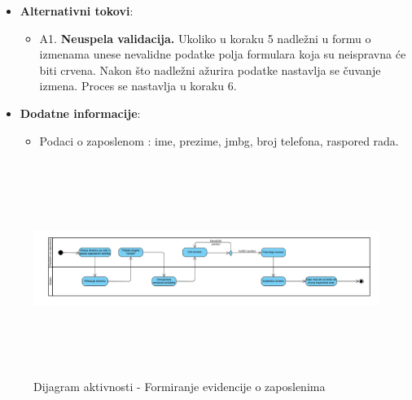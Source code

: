\begin{itemize}
  \item \textbf{Alternativni tokovi}:
      \begin{itemize}
        \item A1. \textbf{Neuspela validacija.}
        Ukoliko u koraku 5 nadležni u formu o izmenama unese nevalidne podatke polja formulara koja su neispravna će biti crvena.
        Nakon što nadležni ažurira podatke nastavlja se čuvanje izmena. Proces se nastavlja u koraku 6.
      \end{itemize}

      
  \item \textbf{Dodatne informacije}:
      \begin{itemize}
        \item Podaci o zaposlenom : ime, prezime, jmbg, broj telefona, raspored rada.
      \end{itemize}
\end{itemize}

\begin{figure}[H]
  \begin{center}
      \includegraphics[width=140mm, height=70mm]{Diagrams/evidencija_zaposlenih.png}
  \end{center}
  \caption {Dijagram aktivnosti - Formiranje evidencije o zaposlenima}
  \label{activity_evidencija_zaposlenih}

\end{figure}
